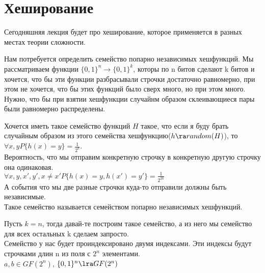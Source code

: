 ﻿\section{Хеширование}        
Сегодняшняя лекция будет про хеширование, которое применяется в разных местах теории сложности. 

Нам потребуется определить семейство попарно независимых хешфункций. 
Мы рассматриваем функции $\{0, 1\}^n \to \{0, 1\}^k$, которы по n битов сделают k битов и 
хочется, что бы эти функции разбрасывали строчки достаточно равномерно, 
при этом не хочется, что бы этих функций было сверх много, но при этом много. Нужно,
что бы при взятии хешфункции случайнм образом склеивающиеся пары были равномерно распределены.

\begin{Def}
	Хочется иметь такое семейство функций $H$ такое, что если я буду брать случайным образом из 
	этого семейства хешфункцию($h \ra random(H)$), то 
	$\forall x, y P\{h(x) = y\} = \frac{1}{2^k}$.\\
	Вероятность, что мы отправим конкретную строчку в конкретную другую строчку она одинаковая.\\ 

	$\forall x, y, x', y', x\ne x' P\{h(x) = y, h(x') = y'\} = \frac{1}{2^{2k}}$\\
	А события что мы две разные строчки куда-то отправили должны быть независимые.\\ 

	Такое семейство называется семейством попарно независимых хешфункций. 
\end{Def}

Пусть $k = n$, тогда давай-те построим такое семейство, а из него
мы семейство для всех остальных k сделаем запросто.\\

Семейство у нас будет проиндексировано двумя индексами. Эти индексы будут 
строчками длин n из поля с $2^n$ элементами.\\ 
$a, b \in GF(2^n)$, 
$\{0, 1\}^{n} \lra GF(2^n)$\\

